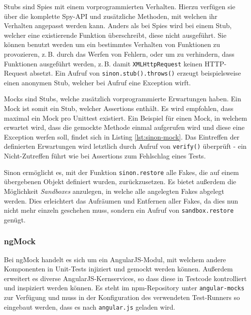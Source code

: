 Stubs sind Spies mit einem vorprogrammierten Verhalten. Hierzu verfügen sie über die komplette Spy-API und zusätzliche Methoden, mit welchen ihr Verhalten angepasst werden kann. Anders als bei Spies wird bei einem Stub, welcher eine existierende Funktion überschreibt, diese nicht ausgeführt. Sie können benutzt werden um ein bestimmtes Verhalten von Funktionen zu provozieren, z.\,B. durch das Werfen von Fehlern, oder um zu verhindern, dass Funktionen ausgeführt werden, z.\,B. damit \texttt{XMLHttpRequest} keinen HTTP-Request absetzt. Ein Aufruf von \texttt{sinon.stub().throws()} erzeugt beispielsweise einen anonymen Stub, welcher bei Aufruf eine Exception wirft. \cite{sinonjs-stubs}

Mocks sind Stubs, welche zusätzlich vorprogrammierte Erwartungen haben. Ein Mock ist somit ein Stub, welcher Assertions enthält. Es wird empfohlen, dass maximal ein Mock pro Unittest existiert. Ein Beispiel für einen Mock, in welchem erwartet wird, dass die gemockte Methode einmal aufgerufen wird und diese eine Exception werfen soll, findet sich in Listing \ref{lst:sinon-mock}. Das Eintreffen der definierten Erwartungen wird letztlich durch Aufruf von \texttt{verify()} überprüft - ein Nicht-Zutreffen führt wie bei Assertions zum Fehlschlag eines Tests. \cite{sinonjs-mocks}

\begin{figure}[H]
	
\end{figure}

Sinon ermöglicht es, mit der Funktion \texttt{sinon.restore} alle Fakes, die auf einem übergebenen Objekt definiert wurden, zurückzusetzen. Es bietet außerdem die Möglichkeit \textit{Sandboxes} anzulegen, in welche alle angelegten Fakes abgelegt werden. Dies erleichtert das Aufräumen und Entfernen aller Fakes, da dies nun nicht mehr einzeln geschehen muss, sondern ein Aufruf von \texttt{sandbox.restore} genügt. \cite{sinonjs-sandboxes}

\subsubsection{ngMock}
\label{sec:ngMock}
Bei ngMock handelt es sich um ein AngularJS-Modul, mit welchem andere Komponenten in Unit-Tests injiziert und gemockt werden können. Außerdem erweitert es diverse AngularJS-Kernservices, so dass diese in Testcode kontrolliert und inspiziert werden können. Es steht im npm-Repository unter \texttt{angular-mocks} zur Verfügung und muss in der Konfiguration des verwendeten Test-Runners so eingebaut werden, dass es nach \texttt{angular.js} geladen wird. \cite{angular-ngMock}

